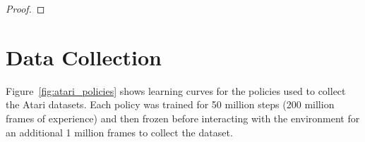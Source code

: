 \documentclass{article}
\newtheorem{theorem}{Theorem}
\newcommand{\EE}{\mathbb{E}}
\newcommand{\norm}[1]{\left \lVert #1 \right \rVert}
\begin{document}
\begin{proof}
          
\end{proof}



\section{Data Collection}
\label{supp:hypers}
Figure~\ref{fig:atari_policies} shows learning curves for the policies used to collect the Atari datasets. Each policy was trained for 50 million steps (200 million frames of experience) and then frozen before interacting with the environment for an additional 1 million frames to collect the dataset.
\end{document}
